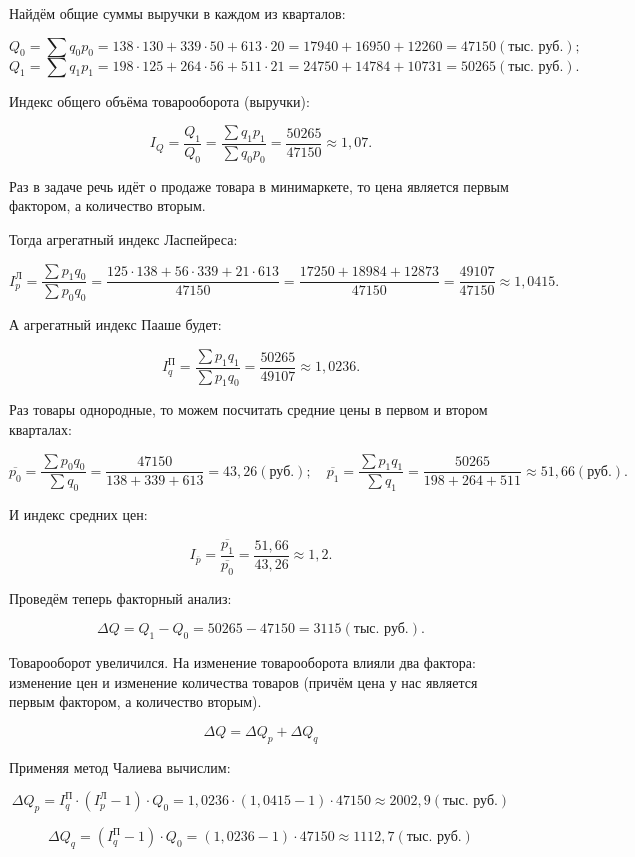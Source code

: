 \documentclass[fleqn]{article}
\begin{document}
Найдём общие суммы выручки в каждом из кварталов:

$$Q_0=\sum{q_0p_0}=138\cdot130+339\cdot50+613\cdot20=17940+16950+12260=47150 (\textit{тыс. руб.});$$
$$Q_1=\sum{q_1p_1}=198\cdot125+264\cdot56+511\cdot21=24750+14784+10731=50265  (\textit{тыс. руб.}).$$

Индекс общего объёма товарооборота (выручки):

$$I_Q=\frac{Q_1}{Q_0}=\frac{\sum{q_1p_1}}{\sum{q_0p_0}}=\frac{50265}{47150}\approx1,07.$$

Раз в задаче речь идёт о продаже товара в минимаркете, то цена является первым фактором, а количество вторым.

Тогда агрегатный индекс Ласпейреса:

$$I_p^\textit{Л}=\frac{\sum{p_1q_0}}{\sum{p_0q_0}}=\frac{125\cdot138+56\cdot339+21\cdot613}{47150}=\frac{17250+18984+12873}{47150}=\frac{49107}{47150}\approx1,0415.$$

А агрегатный индекс Пааше будет:

$$I_q^\textit{П}=\frac{\sum{p_1q_1}}{\sum{p_1q_0}}=\frac{50265}{49107}\approx1,0236.$$

Раз товары однородные, то можем посчитать средние цены в первом и втором кварталах:

$$\overline{p_0}=\frac{\sum{p_0q_0}}{\sum{q_0}}=\frac{47150}{138+339+613}=43,26 (\textit{руб.});\quad\overline{p_1}=\frac{\sum{p_1q_1}}{\sum{q_1}}=\frac{50265}{198+264+511}\approx51,66 (\textit{руб.}).$$

И индекс средних цен:

$$I_{\overline{p}}=\frac{\overline{p_1}}{\overline{p_0}}=\frac{51,66}{43,26}\approx1,2.$$

Проведём теперь факторный анализ:

$$\Delta Q=Q_1-Q_0=50265-47150=3115 (\textit{тыс. руб.}).$$

Товарооборот увеличился. На изменение товарооборота влияли два фактора: изменение цен и изменение количества товаров (причём цена у нас является первым фактором, а количество вторым).

$$\Delta Q=\Delta Q_p+\Delta Q_q$$

Применяя метод Чалиева вычислим:

$$\Delta Q_p=I_q^\textit{П}\cdot\left(I_p^\textit{Л}-1\right)\cdot Q_0=1,0236\cdot(1,0415-1)\cdot47150\approx2002,9 (\textit{тыс. руб.})$$

$$\Delta Q_q=\left(I_q^\textit{П}-1\right)\cdot Q_0=(1,0236-1)\cdot47150\approx1112,7 (\textit{тыс. руб.})$$
\end{document}
